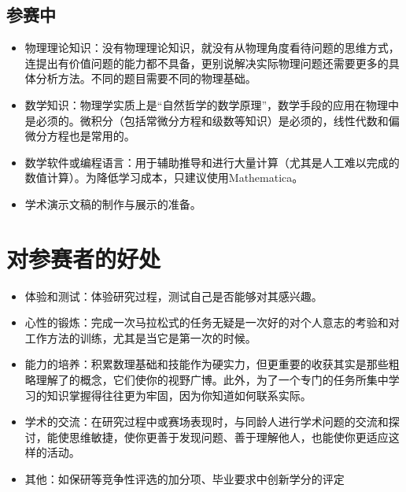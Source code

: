 \documentclass[a4paper,10pt,english]{sphinxmanual}
\begin{document}
\subsection{参赛中}
\label{\detokenize{2. Intro_Tournament:id8}}\begin{itemize}
\item {} 
物理理论知识：没有物理理论知识，就没有从物理角度看待问题的思维方式，连提出有价值问题的能力都不具备，更别说解决实际物理问题还需要更多的具体分析方法。不同的题目需要不同的物理基础。

\item {} 
数学知识：物理学实质上是“自然哲学的数学原理”，数学手段的应用在物理中是必须的。微积分（包括常微分方程和级数等知识）是必须的，线性代数和偏微分方程也是常用的。

\item {} 
数学软件或编程语言：用于辅助推导和进行大量计算（尤其是人工难以完成的数值计算）。为降低学习成本，只建议使用Mathematica。

\item {} 
学术演示文稿的制作与展示的准备。

\end{itemize}


\section{对参赛者的好处}
\label{\detokenize{2. Intro_Tournament:id9}}\begin{itemize}
\item {} 
体验和测试：体验研究过程，测试自己是否能够对其感兴趣。

\item {} 
心性的锻炼：完成一次马拉松式的任务无疑是一次好的对个人意志的考验和对工作方法的训练，尤其是当它是第一次的时候。

\item {} 
能力的培养：积累数理基础和技能作为硬实力，但更重要的收获其实是那些粗略理解了的概念，它们使你的视野广博。此外，为了一个专门的任务所集中学习的知识掌握得往往更为牢固，因为你知道如何联系实际。

\item {} 
学术的交流：在研究过程中或赛场表现时，与同龄人进行学术问题的交流和探讨，能使思维敏捷，使你更善于发现问题、善于理解他人，也能使你更适应这样的活动。

\item {} 
其他：如保研等竞争性评选的加分项、毕业要求中创新学分的评定

\end{itemize}
\end{document}

